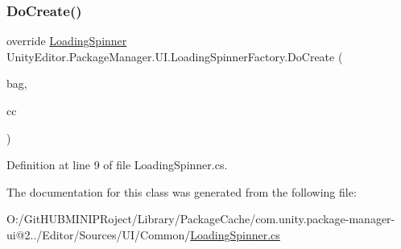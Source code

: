 \subsubsection{\texorpdfstring{DoCreate()}{DoCreate()}}
{\footnotesize\ttfamily override \mbox{\hyperlink{class_unity_editor_1_1_package_manager_1_1_u_i_1_1_loading_spinner}{Loading\+Spinner}} Unity\+Editor.\+Package\+Manager.\+U\+I.\+Loading\+Spinner\+Factory.\+Do\+Create (\begin{DoxyParamCaption}\item[{I\+Uxml\+Attributes}]{bag,  }\item[{Creation\+Context}]{cc }\end{DoxyParamCaption})\hspace{0.3cm}{\ttfamily [protected]}}



Definition at line 9 of file Loading\+Spinner.\+cs.



The documentation for this class was generated from the following file\+:\begin{DoxyCompactItemize}
\item 
O\+:/\+Git\+H\+U\+B\+M\+I\+N\+I\+P\+Roject/\+Library/\+Package\+Cache/com.\+unity.\+package-\/manager-\/ui@2../\+Editor/\+Sources/\+U\+I/\+Common/\mbox{\hyperlink{_loading_spinner_8cs}{Loading\+Spinner.\+cs}}\end{DoxyCompactItemize}
